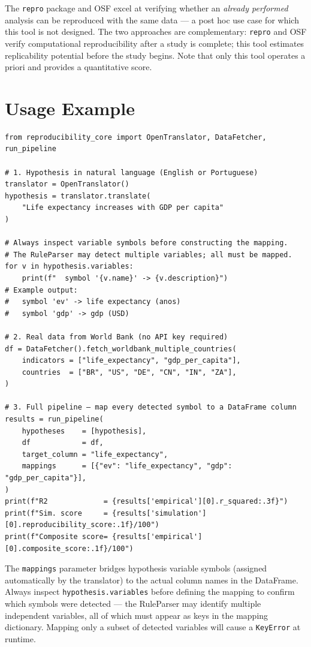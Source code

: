\documentclass[12pt,a4paper]{article}
\begin{document}
The \texttt{repro} package and OSF excel at verifying whether an \textit{already performed}
analysis can be reproduced with the same data --- a post hoc use case for which
this tool is not designed. The two approaches are complementary: \texttt{repro} and
OSF verify computational reproducibility after a study is complete; this tool
estimates replicability potential before the study begins. Note that only this
tool operates a priori and provides a quantitative score.

\section{Usage Example}

\begin{lstlisting}[caption={Minimal working example: hypothesis translation, World Bank data retrieval, and full pipeline execution.}]
from reproducibility_core import OpenTranslator, DataFetcher, run_pipeline

# 1. Hypothesis in natural language (English or Portuguese)
translator = OpenTranslator()
hypothesis = translator.translate(
    "Life expectancy increases with GDP per capita"
)

# Always inspect variable symbols before constructing the mapping.
# The RuleParser may detect multiple variables; all must be mapped.
for v in hypothesis.variables:
    print(f"  symbol '{v.name}' -> {v.description}")
# Example output:
#   symbol 'ev' -> life expectancy (anos)
#   symbol 'gdp' -> gdp (USD)

# 2. Real data from World Bank (no API key required)
df = DataFetcher().fetch_worldbank_multiple_countries(
    indicators = ["life_expectancy", "gdp_per_capita"],
    countries  = ["BR", "US", "DE", "CN", "IN", "ZA"],
)

# 3. Full pipeline — map every detected symbol to a DataFrame column
results = run_pipeline(
    hypotheses    = [hypothesis],
    df            = df,
    target_column = "life_expectancy",
    mappings      = [{"ev": "life_expectancy", "gdp": "gdp_per_capita"}],
)
print(f"R2             = {results['empirical'][0].r_squared:.3f}")
print(f"Sim. score     = {results['simulation'][0].reproducibility_score:.1f}/100")
print(f"Composite score= {results['empirical'][0].composite_score:.1f}/100")
\end{lstlisting}

The \texttt{mappings} parameter bridges hypothesis variable symbols (assigned
automatically by the translator) to the actual column names in the DataFrame.
Always inspect \texttt{hypothesis.variables} before defining the mapping to confirm
which symbols were detected --- the RuleParser may identify multiple independent
variables, all of which must appear as keys in the mapping dictionary.
Mapping only a subset of detected variables will cause a \texttt{KeyError} at runtime.
\end{document}
